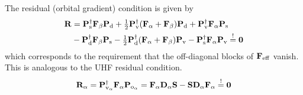 \documentclass[11pt]{article}
\begin{document}
The residual (orbital gradient) condition is given by
\begin{align}
  \mathbf{R}
&=
  \mathbf{P}_{\mathrm{s}}^\dagger
  \mathbf{F}_{\beta }
  \mathbf{P}_{\mathrm{d}}
+
  \tfrac{1}{2}
  \mathbf{P}_{\mathrm{v}}^\dagger
  (
    \mathbf{F}_{\alpha }
  +
    \mathbf{F}_{\beta }
  )
  \mathbf{P}_{\mathrm{d}}
+
  \mathbf{P}_{\mathrm{v}}^\dagger
  \mathbf{F}_{\alpha }
  \mathbf{P}_{\mathrm{s}}
\\
&-
  \mathbf{P}_{\mathrm{d}}^\dagger
  \mathbf{F}_{\beta }
  \mathbf{P}_{\mathrm{s}}
-
  \tfrac{1}{2}
  \mathbf{P}_{\mathrm{d}}^\dagger
  (
    \mathbf{F}_{\alpha }
  +
    \mathbf{F}_{\beta }
  )
  \mathbf{P}_{\mathrm{v}}
-
  \mathbf{P}_{\mathrm{s}}^\dagger
  \mathbf{F}_{\alpha }
  \mathbf{P}_{\mathrm{v}}
\overset{!}{=}
  \mathbf{0}
\end{align}
which corresponds to the requirement that the off-diagonal blocks of $\mathbf{F}_{\mathrm{eff}}$ vanish.
This is analogous to the UHF residual condition.
\begin{align}
  \mathbf{R}_{\alpha }
=
  \mathbf{P}_{\mathrm{v}_{\alpha }}^\dagger
  \mathbf{F}_{\alpha }
  \mathbf{P}_{\mathrm{o}_{\alpha }}
=
  \mathbf{F}_{\alpha }
  \mathbf{D}_{\alpha }
  \mathbf{S}
-
  \mathbf{S}
  \mathbf{D}_{\alpha }
  \mathbf{F}_{\alpha }
\overset{!}{=}
  \mathbf{0}
\end{align}
\end{document}
